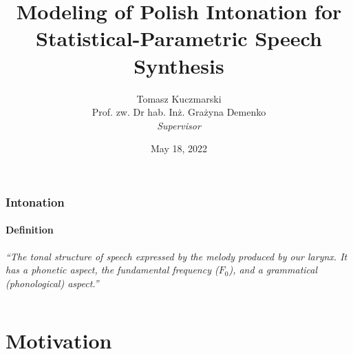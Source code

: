 \documentclass[a4paper,9pt]{beamer}
\theoremstyle{mytheoremstyle}
\begin{document}
\title[Modeling of Polish Intonation for SPSS]{Modeling of Polish Intonation for Statistical-Parametric Speech Synthesis}
\author[Tomasz Kuczmarski]{Tomasz Kuczmarski\\
\vspace{0.5cm}
\small{Prof. zw. Dr hab. In\.z. Gra\.zyna Demenko}\\
\textit{\tiny{Supervisor}}}

\date{\tiny{May 18, 2022}}

%
\begin{frame}
\titlepage
\end{frame}




\begin{frame}
\frametitle{Intonation}
\framesubtitle{Definition}
\vspace{2cm}
\textit<1-2>{``The tonal structure of speech expressed by the melody produced by our larynx. It has a phonetic aspect, the fundamental frequency ($F_{0}$), and a grammatical (phonological) aspect.''} \parencite{fery2016}
\begin{columns}
\vspace{0.5cm}
\end{columns}
\end{frame}

\section{Motivation}
\end{document}
